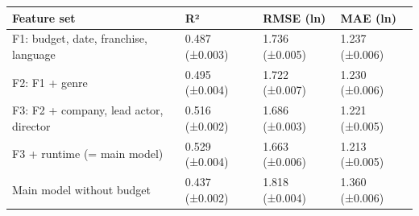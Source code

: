 \begin{tabular}{llll}
\toprule
Feature set & R² & RMSE (ln) & MAE (ln) \\
\midrule
F1: budget, date, franchise, language & 0.487 (±0.003) & 1.736 (±0.005) & 1.237 (±0.006) \\
F2: F1 + genre & 0.495 (±0.004) & 1.722 (±0.007) & 1.230 (±0.006) \\
F3: F2 + company, lead actor, director & 0.516 (±0.002) & 1.686 (±0.003) & 1.221 (±0.005) \\
F3 + runtime (= main model) & 0.529 (±0.004) & 1.663 (±0.006) & 1.213 (±0.005) \\
Main model without budget & 0.437 (±0.002) & 1.818 (±0.004) & 1.360 (±0.006) \\
\bottomrule
\end{tabular}
